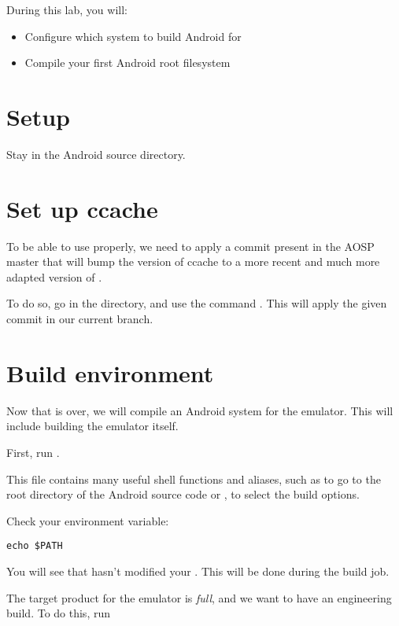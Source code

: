 
During this lab, you will:
\begin{itemize}
  \item Configure which system to build Android for
  \item Compile your first Android root filesystem
\end{itemize}

\section{Setup}

Stay in the Android source directory.

\section{Set up ccache}

To be able to use  properly, we need to apply a commit
present in the AOSP master that will bump the version of ccache to a
more recent and much more adapted version of .

To do so, go in the  directory, and use the
command . This will apply the given
commit in our current branch.

\section{Build environment}

Now that  is over, we will compile an Android system
for the emulator. This will include building the emulator itself.

First, run .

This file contains many useful shell functions and aliases, such as
 to go to the root directory of the Android source code or
, to select the build options.

Check your  environment variable:

\begin{verbatim}
echo $PATH
\end{verbatim}

You will see that  hasn't modified your
.  This will be done during the build job.

The target product for the emulator is {\it full}, and we want to
have an engineering build. To do this, run 


